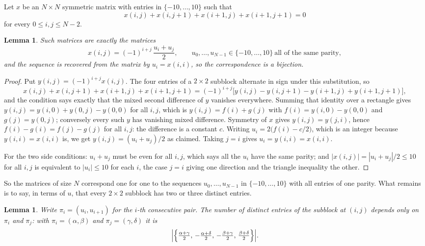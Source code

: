 \documentclass[11pt,a4paper]{article}
\theoremstyle{plain}
\newtheorem{lemma}[theorem]{Lemma}
\theoremstyle{definition}
\begin{document}
Let $x$ be an $N\times N$ symmetric matrix with entries in $\{-10,\dots,10\}$ such that
\[
x(i,j)+x(i,j{+}1)+x(i{+}1,j)+x(i{+}1,j{+}1)=0
\]
for every $0\le i,j\le N-2$.

\begin{lemma}\label{lem:solve}
Such matrices are exactly the matrices
\[
x(i,j)=(-1)^{i+j}\,\frac{u_i+u_j}{2},
\qquad u_0,\dots,u_{N-1}\in\{-10,\dots,10\}\ \text{all of the same parity},
\]
and the sequence is recovered from the matrix by $u_i=x(i,i)$, so the correspondence is a
bijection.
\end{lemma}

\begin{proof}
Put $y(i,j)=(-1)^{i+j}x(i,j)$. The four entries of a $2\times2$ subblock alternate in sign
under this substitution, so
\[
x(i,j)+x(i,j{+}1)+x(i{+}1,j)+x(i{+}1,j{+}1)
=(-1)^{i+j}\bigl[y(i,j)-y(i,j{+}1)-y(i{+}1,j)+y(i{+}1,j{+}1)\bigr],
\]
and the condition says exactly that the mixed second difference of $y$ vanishes everywhere.
Summing that identity over a rectangle gives
$y(i,j)=y(i,0)+y(0,j)-y(0,0)$ for all $i,j$, which is $y(i,j)=f(i)+g(j)$ with
$f(i)=y(i,0)-y(0,0)$ and $g(j)=y(0,j)$; conversely every such $y$ has vanishing mixed
difference. Symmetry of $x$ gives $y(i,j)=y(j,i)$, hence $f(i)-g(i)=f(j)-g(j)$ for all $i,j$:
the difference is a constant $c$. Writing $u_i=2\bigl(f(i)-c/2\bigr)$, which is an integer
because $y(i,i)=x(i,i)$ is, we get $y(i,j)=(u_i+u_j)/2$ as claimed. Taking $j=i$ gives
$u_i=y(i,i)=x(i,i)$.

For the two side conditions: $u_i+u_j$ must be even for all $i,j$, which says all the $u_i$ have
the same parity; and $|x(i,j)|=|u_i+u_j|/2\le10$ for all $i,j$ is equivalent to $|u_i|\le10$
for each $i$, the case $j=i$ giving one direction and the triangle inequality the other.
\end{proof}

So the matrices of size $N$ correspond one for one to the sequences $u_0,\dots,u_{N-1}$ in
$\{-10,\dots,10\}$ with all entries of one parity. What remains is to say, in terms of $u$,
that every $2\times2$ subblock has two or three distinct entries.

\begin{lemma}\label{lem:block}
Write $\pi_i=(u_i,u_{i+1})$ for the $i$-th consecutive pair. The number of distinct entries of
the subblock at $(i,j)$ depends only on $\pi_i$ and $\pi_j$: with $\pi_i=(\alpha,\beta)$ and
$\pi_j=(\gamma,\delta)$ it is
\[
\Bigl|\Bigl\{\tfrac{\alpha+\gamma}{2},\,-\tfrac{\alpha+\delta}{2},\,
-\tfrac{\beta+\gamma}{2},\,\tfrac{\beta+\delta}{2}\Bigr\}\Bigr| .
\]
\end{lemma}
\end{document}
